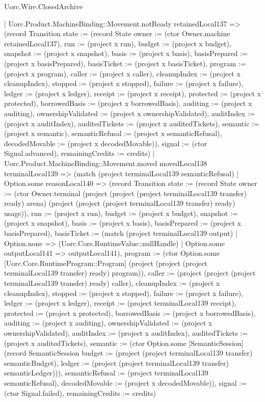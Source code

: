 \begin{lexlean}{Uorc.Wire.ClosedArchive}
\begin{semanticmodule}
{      | Uorc.Product.MachineBinding::Movement.notReady retainedLocal137 => (record Transition {state := (record State {owner := (ctor Owner.machine retainedLocal137), run := (project x run), budget := (project x budget), snapshot := (project x snapshot), basis := (project x basis), basisPrepared := (project x basisPrepared), basisTicket := (project x basisTicket), program := (project x program), caller := (project x caller), cleanupIndex := (project x cleanupIndex), stopped := (project x stopped), failure := (project x failure), ledger := (project x ledger), receipt := (project x receipt), protected := (project x protected), borrowedBasis := (project x borrowedBasis), auditing := (project x auditing), ownershipValidated := (project x ownershipValidated), auditIndex := (project x auditIndex), auditedTickets := (project x auditedTickets), semantic := (project x semantic), semanticRefusal := (project x semanticRefusal), decodedMovable := (project x decodedMovable)}), signal := (ctor Signal.advanced), remainingCredits := credits})
      | Uorc.Product.MachineBinding::Movement.moved movedLocal138 terminalLocal139 => (match (project terminalLocal139 semanticRefusal)
        | Option.some reasonLocal140 => (record Transition {state := (record State {owner := (ctor Owner.terminal (project (project (project terminalLocal139 transfer) ready) arena) (project (project (project terminalLocal139 transfer) ready) usage)), run := (project x run), budget := (project x budget), snapshot := (project x snapshot), basis := (project x basis), basisPrepared := (project x basisPrepared), basisTicket := (match (project terminalLocal139 output)
          | Option.none => (Uorc.Core.RuntimeValue::nullHandle)
          | Option.some outputLocal141 => outputLocal141), program := (ctor Option.some [Uorc.Core.RuntimeProgram::Program] (project (project (project terminalLocal139 transfer) ready) program)), caller := (project (project (project terminalLocal139 transfer) ready) caller), cleanupIndex := (project x cleanupIndex), stopped := (project x stopped), failure := (project x failure), ledger := (project x ledger), receipt := (project terminalLocal139 receipt), protected := (project x protected), borrowedBasis := (project x borrowedBasis), auditing := (project x auditing), ownershipValidated := (project x ownershipValidated), auditIndex := (project x auditIndex), auditedTickets := (project x auditedTickets), semantic := (ctor Option.some [SemanticSession] (record SemanticSession {budget := (project (project terminalLocal139 transfer) semanticBudget), ledger := (project (project terminalLocal139 transfer) semanticLedger)})), semanticRefusal := (project terminalLocal139 semanticRefusal), decodedMovable := (project x decodedMovable)}), signal := (ctor Signal.failed), remainingCredits := credits})
}
\end{semanticmodule}
\end{lexlean}
